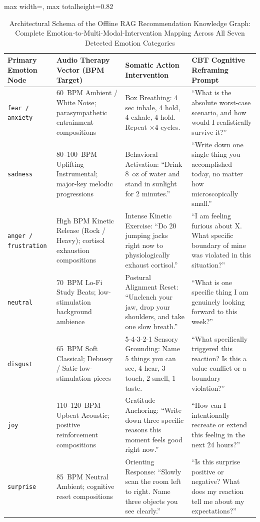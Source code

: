 \documentclass[12pt,twoside]{article}
\begin{document}
\begin{table}[htbp]
\centering
\Large
\renewcommand{\arraystretch}{2.4}
\setlength{\tabcolsep}{12pt}
\begin{adjustbox}{max width=\textwidth, max totalheight=0.82\textheight}
\begin{tabular}{|p{3.0cm}|p{4.2cm}|p{4.5cm}|p{5.0cm}|}
\hline
\rowcolor{gray!20}
\textbf{Primary Emotion Node} & \textbf{Audio Therapy Vector (BPM Target)} & \textbf{Somatic Action Intervention} & \textbf{CBT Cognitive Reframing Prompt} \\
\hline
\texttt{fear / anxiety} & 60~BPM Ambient / White Noise; parasympathetic entrainment compositions & Box Breathing: 4 sec inhale, 4 hold, 4 exhale, 4 hold. Repeat $\times$4 cycles. & ``What is the absolute worst-case scenario, and how would I realistically survive it?'' \\
\hline
\texttt{sadness} & 80--100~BPM Uplifting Instrumental; major-key melodic progressions & Behavioral Activation: ``Drink 8~oz of water and stand in sunlight for 2 minutes.'' & ``Write down one single thing you accomplished today, no matter how microscopically small.'' \\
\hline
\texttt{anger / frustration} & High BPM Kinetic Release (Rock / Heavy); cortisol exhaustion compositions & Intense Kinetic Exercise: ``Do 20 jumping jacks right now to physiologically exhaust cortisol.'' & ``I am feeling furious about X. What specific boundary of mine was violated in this situation?'' \\
\hline
\texttt{neutral} & 70~BPM Lo-Fi Study Beats; low-stimulation background ambience & Postural Alignment Reset: ``Unclench your jaw, drop your shoulders, and take one slow breath.'' & ``What is one specific thing I am genuinely looking forward to this week?'' \\
\hline
\texttt{disgust} & 65~BPM Soft Classical; Debussy / Satie low-stimulation pieces & 5-4-3-2-1 Sensory Grounding: Name 5 things you can see, 4 hear, 3 touch, 2 smell, 1 taste. & ``What specifically triggered this reaction? Is this a value conflict or a boundary violation?'' \\
\hline
\texttt{joy} & 110--120~BPM Upbeat Acoustic; positive reinforcement compositions & Gratitude Anchoring: ``Write down three specific reasons this moment feels good right now.'' & ``How can I intentionally recreate or extend this feeling in the next 24 hours?'' \\
\hline
\texttt{surprise} & 85~BPM Neutral Ambient; cognitive reset compositions & Orienting Response: ``Slowly scan the room left to right. Name three objects you see clearly.'' & ``Is this surprise positive or negative? What does my reaction tell me about my expectations?'' \\
\hline
\end{tabular}
\end{adjustbox}
\caption{Architectural Schema of the Offline RAG Recommendation Knowledge Graph: Complete Emotion-to-Multi-Modal-Intervention Mapping Across All Seven Detected Emotion Categories}
\label{tab:rag_knowledge}
\end{table}
\end{document}
